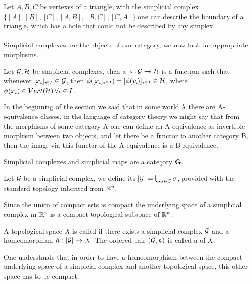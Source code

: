 \documentclass[../1.tex]{subfiles}
\begin{document}
    Let $A,B,C$ be vertexes of a triangle, with the simplicial complex $\{[A],[B],[C],[A,B],[B,C],[C,A]\}$ one can describe the boundary of a triangle, which has
    a hole that could not be described by any simplex.\\
    \hfill \\
    Simplicial complexes are the objects of our category, we now look for appropriate morphisms.

    \begin{defn}
        Let $\mathcal{G},\mathcal{H}$ be simplicial complexes, then a  $\phi : \mathcal{G} \to \mathcal{H}$ is a function 
        such that whenever $[ x_i ]_{i \in I} \in \mathcal{G}$, then $\phi([ x_i ]_{i \in I}) = [ \phi(v_i) ]_{i \in I} \in \mathcal{H}$,
        where $\phi(x_i) \in Vert(\mathcal{H}) \, \forall i \in I$.
    \end{defn}

    In the beginning of the section we said that in some world A there are A-equivalence classes, in the language of category theory we might say that
    from the morphisms of some category A one can define an A-equivalence as invertible morphism between two objects, and let there be a functor to another category 
    B, then the image via this functor of the A-equivalence is a B-equivalence.

    \begin{thm}
        Simplicial complexes and simplicial maps are a category $\textbf{G}$.
    \end{thm}

    \begin{defn}
        Let $\mathcal{G}$ be a simplicial complex, we define its  $|\mathcal{G}| = \bigcup_{\sigma \in \mathcal{G}} \sigma$, provided with
        the standard topology inherited from $\mathbb{R}^n$.
    \end{defn}

    Since the union of compact sets is compact the underlying space of a simplicial complex in $\mathbb{R}^n$ is a compact topological subspace of $\mathbb{R}^n$.

    \begin{defn}
        A topological space $X$ is called  if there exists a simplicial complex $\mathcal{G}$ and a homeomorphism
        $h : |\mathcal{G}| \to X$. The ordered pair $(\mathcal{G}, h)$ is called a  of $X$.
    \end{defn}

    One understands that in order to have a homeomorphism between the compact underlying space of a simplcial complex and another topological
    space, this other space has to be compact.
\end{document}
